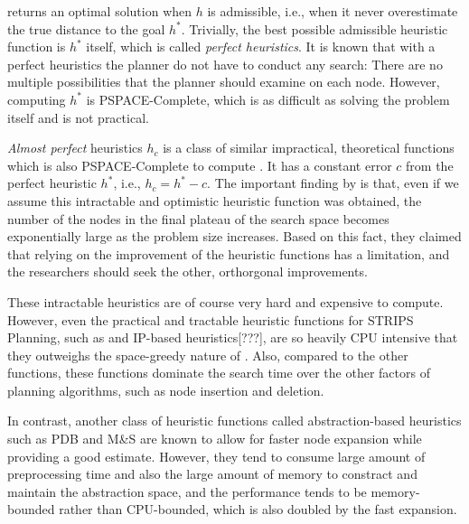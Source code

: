 
\astar returns an optimal solution when $h$ is admissible, i.e., when it
never overestimate the true distance to the goal $h^*$.
Trivially, the best possible admissible heuristic function is $h^*$ itself, which is
called \emph{perfect heuristics}.
It is known that with a perfect heuristics the planner do not have to
conduct any search: There are no multiple possibilities that the
planner should examine on each node.
However, computing $h^*$ is PSPACE-Complete,
which is as difficult as solving the problem itself and is not
practical.

\emph{Almost perfect} heuristics $h_c$ is a class of similar
impractical, theoretical functions which is also PSPACE-Complete to
compute \cite{helmert2008good}.  It has a constant error $c$ from the
perfect heuristic $h^*$, i.e., $h_c=h^*-c$.  The important finding by
\citeauthor{helmert2008good} is that, even if we assume this intractable and
optimistic heuristic function was obtained, the number of the nodes in the final
plateau of the search space becomes exponentially large as the problem size
increases. Based on this fact, they claimed that relying on the
improvement of the heuristic functions has a limitation,
and the researchers should seek the other, orthorgonal improvements.


These intractable heuristics are of course very hard and expensive to
compute. However, even the practical and tractable \sota heuristic
functions for STRIPS Planning, such as \lmcut\cite{Helmert2009} and
IP-based heuristics[???], are so heavily CPU intensive that they
outweighs the space-greedy nature of \astar. Also, compared to the other
functions, these functions dominate the search time over the other
factors of planning algorithms, such as node insertion and deletion.

In contrast, another class of \sota heuristic functions called abstraction-based heuristics
such as PDB \cite{edelkamp2001planning} and M\&S \cite{helmert2007flexible}
are known to allow for faster node expansion while providing a good estimate.
However, they tend to consume large amount of preprocessing time and also
the large amount of memory to constract and maintain the abstraction
space,
and the performance tends to be memory-bounded rather than CPU-bounded,
which is also doubled by the fast expansion.

